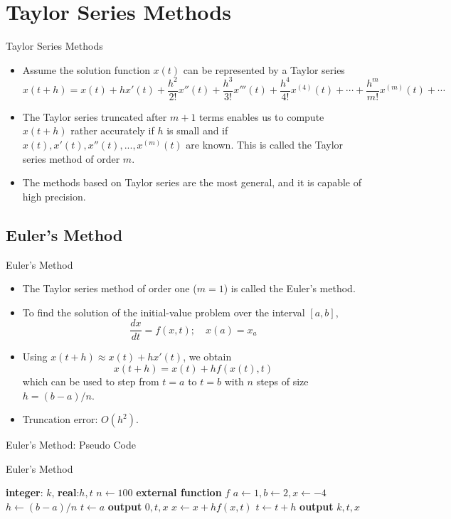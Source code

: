 \documentclass{beamer}
\newcommand{\beforeverb}{\scriptsize}
\newcommand{\afterverb}{\normalsize}
\begin{document}
\section[Taylor Series Methods]{Taylor Series Methods }
\begin{frame}{Taylor Series Methods}

\begin{itemize}
\item Assume the solution function $x(t)$ can be represented by a Taylor series
\beforeverb
\[
x(t+h)=x(t)+h x'(t)+\frac{h^2}{2!}x''(t)+\frac{h^3}{3!}x'''(t)+\frac{h^4}{4!}x^{(4)}(t) +\cdots+\frac{h^m}{m!}x^{(m)}(t)+\cdots
\]
\afterverb
\item The Taylor series truncated after $m+1$ terms enables us to compute $x(t+h)$ rather accurately if $h$ is small and if $x(t),x'(t),x''(t),...,x^{(m)}(t)$ are known. This is called the \alert{Taylor series method of order $m$}.
\item The methods based on Taylor series are the most \alert{general}, and it is capable of \alert{high precision}. 	
\end{itemize}
\end{frame}


\subsection[Euler's Method]{Euler's Method}
\begin{frame}{Euler's Method}

\begin{itemize}
\item The Taylor series method of order one ($m=1$) is called the \alert{Euler's method}.
\item To find the solution of the initial-value problem over the interval $[a,b]$,
\beforeverb
\[
\frac{dx}{dt}=f(x,t);\quad x(a)=x_a
\]
\afterverb
\item Using $x(t+h)\approx x(t)+hx'(t)$, we obtain 
\[
x(t+h)=x(t)+hf(x(t),t)
\]
which can be used to step from $t=a$ to $t=b$ with $n$ steps of size $h=(b-a)/n$.
\item Truncation error: $O(h^2)$.
\end{itemize}
\end{frame}

\begin{frame}{Euler's Method: Pseudo Code}
\begin{block}{Euler's Method}
\begin{algorithmic}[1]
\State \textbf{integer}: $k$, \textbf{real}:$h, t$
\State $n\gets 100$
\State \textbf{external function} $f$
\State $a\gets 1, b  \gets 2, x\gets -4$
\State $h\gets  (b-a)/n$
\State $t\gets a $
\State \textbf{output} $0,t,x$
\State $x \gets x+hf(x,t)$
\State $t\gets t+h$
\State \textbf{output} $k,t,x$
\EndFor
\end{algorithmic}
\end{block}

\end{frame}
\end{document}
